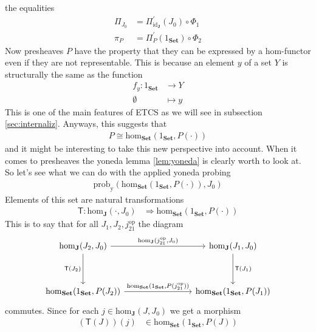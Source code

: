 the equalities
\begin{align*}
  \Pi_{J_{0}}
  &=
  \Pi_{\mathrm{id}_{\mathbf{J}}}^{\prime}(J_{0})
  \circ
  \Phi_{1}
  \\
  \pi_{P}
  &=
  \Pi_{P}^{\prime}(1_{\mathbf{Set}})
  \circ
  \Phi_{2}
\end{align*}
Now presheaves $P$ have the property that they can be expressed by a hom-functor even if they are not representable. This is because an element $y$ of a set $Y$ is structurally the same as the function
\begin{align*}
  f_{y}
  \colon
  1_{\mathbf{Set}}
  &\rightarrow
  Y
  \\
  \emptyset
  &\mapsto
  y
\end{align*}
This is one of the main features of ETCS as we will see in subsection \ref{sec:internaliz}. Anyways, this suggests that
\begin{align*}
  P
  \cong
  \mathrm{hom}_{\mathbf{Set}}(1_{\mathbf{Set}},P(\cdot))
\end{align*}
and it might be interesting to take this new perspective into account. When it comes to presheaves the yoneda lemma \ref{lem:yoneda} is clearly worth to look at. So let's see what we can do with the applied yoneda probing
\begin{align*}
  \mathrm{prob}_{\mathrm{y}}
  \left(
    \mathrm{hom}_{\mathbf{Set}}(1_{\mathbf{Set}},P(\cdot)),
    J_{0}
  \right)
\end{align*}
Elements of this set are natural transformations
\begin{align*}
  \mathsf{T}
  \colon
  \mathrm{hom}_{\mathbf{J}}(\cdot,J_{0})
  &\Rightarrow
  \mathrm{hom}_{\mathbf{Set}}(1_{\mathbf{Set}},P(\cdot))
\end{align*}
This is to say that for all $J_{1},J_{2},j_{21}^{\textrm{op}}$ the diagram
\[
\begin{tikzcd}[row sep=huge, column sep=8em]
  \mathrm{hom}_{\mathbf{J}}(J_{2},J_{0})
  \arrow{r}{\mathrm{hom}_{\mathbf{J}}(j_{21}^{\textrm{op}},J_{0})}
  \arrow[swap]{d}{\mathsf{T}(J_{2})}
  &
  \mathrm{hom}_{\mathbf{J}}(J_{1},J_{0})
  \arrow{d}{\mathsf{T}(J_{1})}
  \\
  \mathrm{hom}_{\mathbf{Set}}(1_{\mathbf{Set}},P(J_{2}))
  \arrow{r}{\mathrm{hom}_{\mathbf{Set}}(1_{\mathbf{Set}},P(j_{21}^{\textrm{op}}))}
  &
  \mathrm{hom}_{\mathbf{Set}}(1_{\mathbf{Set}},P(J_{1}))
\end{tikzcd}
\]
commutes. Since for each $j \in \mathrm{hom}_{\mathbf{J}}(J,J_{0})$ we get a morphism
\begin{align*}
  (\mathsf{T}(J))(j)
  &\in
  \mathrm{hom}_{\mathbf{Set}}(1_{\mathbf{Set}},P(J))
\end{align*}
